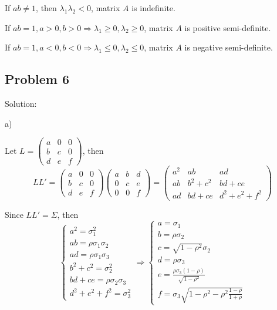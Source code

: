 \documentclass[letterpaper, 11pt]{article}
\newcommand{\1}{\mathds{1}}	%
\theoremstyle{definition}
\begin{document}
If $ab \neq 1$, then $\lambda_1\lambda_2 < 0$, matrix $A$ is indefinite.

If $ab = 1, a >0, b > 0 \Rightarrow \lambda_1 \geq 0, \lambda_2 \geq 0$, matrix $A$ is positive semi-definite.

If $ab = 1, a<0, b< 0 \Rightarrow \lambda_1 \leq 0, \lambda_2 \leq 0$, matrix $A$ is negative semi-definite.


\subsection*{Problem 6}

Solution:

a)

Let $L = \begin{pmatrix}
    a & 0 & 0 \\
    b & c & 0 \\
    d & e & f
  \end{pmatrix}$, then \[
  LL' = \begin{pmatrix}
    a & 0 & 0 \\
    b & c & 0 \\
    d & e & f
  \end{pmatrix} \begin{pmatrix}
    a & b & d \\
    0 & c & e \\
    0 & 0 & f
  \end{pmatrix} = \begin{pmatrix}
    a ^{2} & ab            & ad                   \\
    ab     & b ^{2}+c ^{2} & bd+ce                \\
    ad     & bd+ce         & d ^{2}+e ^{2}+f ^{2}
  \end{pmatrix}
\]

Since $LL'= \Sigma $, then
\[
  \left\{\begin{array}{l}
    a ^{2} = \sigma_{1}^{2}        \\
    ab = \rho\sigma_1\sigma_2      \\
    ad = \rho\sigma_1\sigma_3      \\
    b ^{2}+c ^{2} = \sigma_{2}^{2} \\
    bd+ce = \rho\sigma_2\sigma_3   \\
    d ^{2}+e ^{2} + f ^{2} = \sigma_{3}^{2}
  \end{array}\right. \Rightarrow \left\{\begin{array}{l}
    a = \sigma_1                                        \\
    b = \rho\sigma_2                                    \\
    c = \sqrt{1-\rho ^{2}}\sigma_2                      \\
    d = \rho\sigma_3                                    \\
    e = \frac{\rho\sigma_3(1-\rho)}{\sqrt{1-\rho ^{2}}} \\
    f = \sigma_3 \sqrt{1-\rho ^{2}-\rho ^{2}\frac{1-\rho}{1+\rho}}
  \end{array}\right.
\]
\end{document}
